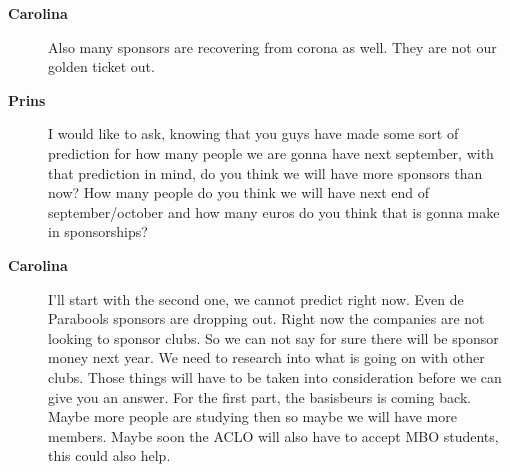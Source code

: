 \documentclass[12pt, a4paper]{article}
\newcommand{\speak}[2]{\begin{description}\item[\textbf{#1}]#2\end{description}}
\begin{document}
\speak{Carolina}{Also many sponsors are recovering from corona as well. They are not our golden ticket out.}

\speak{Prins}{I would like to ask, knowing that you guys have made some sort of prediction for how many people we are gonna have next september, with that prediction in mind, do you think we will have more sponsors than now? How many people do you think we will have next end of september/october and how many euros do you think that is gonna make in sponsorships?}

\speak{Carolina}{I'll start with the second one, we cannot predict right now. Even de Parabools sponsors are dropping out. Right now the companies are not looking to sponsor clubs. So we can not say for sure there will be sponsor money next year. We need to research into what is going on with other clubs. Those things will have to be taken into consideration before we can give you an answer. For the first part, the basisbeurs is coming back. Maybe more people are studying then so maybe we will have more members. Maybe soon the ACLO will also have to accept MBO students, this could also help.}





\end{document}
